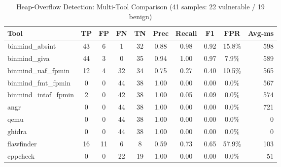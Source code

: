 \begin{table}[ht]
\centering
\caption{Heap-Overflow Detection: Multi-Tool Comparison (41 samples: 22 vulnerable / 19 benign)}
\label{tab:multi-tool}
\begin{tabular}{lccccccccr}
\toprule
Tool & TP & FP & FN & TN & Prec & Recall & F1 & FPR & Avg-ms \\
\midrule
binmind\_absint & 43 & 6 & 1 & 32 & 0.88 & 0.98 & 0.92 & 15.8\% & 598 \\
binmind\_giva & 44 & 3 & 0 & 35 & 0.94 & 1.00 & 0.97 & 7.9\% & 589 \\
binmind\_uaf\_fpmin & 12 & 4 & 32 & 34 & 0.75 & 0.27 & 0.40 & 10.5\% & 565 \\
binmind\_fmt\_fpmin & 0 & 0 & 44 & 38 & 1.00 & 0.00 & 0.00 & 0.0\% & 567 \\
binmind\_intof\_fpmin & 2 & 0 & 42 & 38 & 1.00 & 0.05 & 0.09 & 0.0\% & 574 \\
angr & 0 & 0 & 44 & 38 & 1.00 & 0.00 & 0.00 & 0.0\% & 721 \\
qemu & 0 & 0 & 44 & 38 & 1.00 & 0.00 & 0.00 & 0.0\% & 0 \\
ghidra & 0 & 0 & 44 & 38 & 1.00 & 0.00 & 0.00 & 0.0\% & 0 \\
flawfinder & 16 & 11 & 6 & 8 & 0.59 & 0.73 & 0.65 & 57.9\% & 103 \\
cppcheck & 0 & 0 & 22 & 19 & 1.00 & 0.00 & 0.00 & 0.0\% & 51 \\
\bottomrule
\end{tabular}
\end{table}

